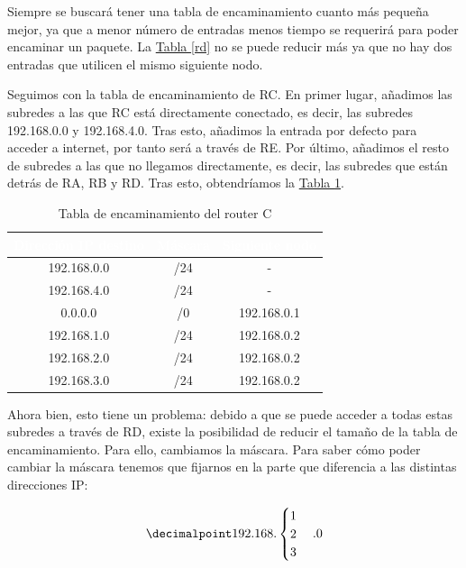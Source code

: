 \documentclass[10pt,a4paper,spanish]{report}
\begin{document}
Siempre se buscará tener una tabla de encaminamiento cuanto más pequeña mejor, ya que a menor número de entradas menos tiempo se requerirá para poder encaminar un paquete. La \hyperref[rd]{Tabla \ref*{rd}} no se puede reducir más ya que no hay dos entradas que utilicen el mismo siguiente nodo.

Seguimos con la tabla de encaminamiento de RC. En primer lugar, añadimos las subredes a las que RC está directamente conectado, es decir, las subredes 192.168.0.0 y 192.168.4.0. Tras esto, añadimos la entrada por defecto para acceder a internet, por tanto será a través de RE. Por último, añadimos el resto de subredes a las que no llegamos directamente, es decir, las subredes que están detrás de RA, RB y RD. Tras esto, obtendríamos la \hyperref[rc]{Tabla \ref*{rc}}. 

\begin{table}[H]
  \centering
  \begin{tabular}{|c|c|c|}
    \hline
    \rowcolor[rgb]{0.0,0.58,0.71} \textcolor{white}{Dirección IP destino} & \textcolor{white}{Máscara} & \textcolor{white}{Siguiente nodo} \\
    \hline
     192.168.0.0 & /24 & - \\
    \hline
     192.168.4.0 & /24 & - \\
    \hline
     0.0.0.0 & /0 & 192.168.0.1 \\
    \hline
     192.168.1.0 & /24 & 192.168.0.2 \\
    \hline
     192.168.2.0 & /24 & 192.168.0.2 \\
    \hline
     192.168.3.0 & /24 & 192.168.0.2 \\
    \hline
  \end{tabular}
  \caption{Tabla de encaminamiento del router C}
  \label{rc}
\end{table}

Ahora bien, esto tiene un problema: debido a que se puede acceder a todas estas subredes a través de RD, existe la posibilidad de reducir el tamaño de la tabla de encaminamiento. Para ello, cambiamos la máscara. Para saber cómo poder cambiar la máscara tenemos que fijarnos en la parte que diferencia a las distintas direcciones IP:

\begin{equation*}
  \decimalpoint
  192.168.
  \begin{cases}
    1 \\
    2 \\
    3
  \end{cases}
  .0
\end{equation*}
\end{document}
